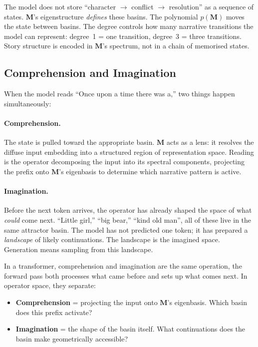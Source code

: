\documentclass[11pt, a4paper]{article}
\newcommand{\M}{\mathbf{M}}
\theoremstyle{plain}
\theoremstyle{definition}
\theoremstyle{remark}
\begin{document}
The model does not store ``character $\to$ conflict $\to$ resolution'' as a sequence of states.
$\M$'s eigenstructure \emph{defines} these basins.
The polynomial $p(\M)$ moves the state between basins.
The degree controls how many narrative transitions the model can represent: degree~1 = one transition, degree~3 = three transitions.
Story structure is encoded in $\M$'s spectrum, not in a chain of memorised states.

\subsection{Comprehension and Imagination}

When the model reads ``Once upon a time there was a,'' two things happen simultaneously:

\paragraph{Comprehension.}
The state is pulled toward the appropriate basin.
$\M$ acts as a lens: it resolves the diffuse input embedding into a structured region of representation space.
Reading is the operator decomposing the input into its spectral components, projecting the prefix onto $\M$'s eigenbasis to determine which narrative pattern is active.

\paragraph{Imagination.}
Before the next token arrives, the operator has already shaped the space of what \emph{could} come next.
``Little girl,'' ``big bear,'' ``kind old man'', all of these live in the same attractor basin.
The model has not predicted one token; it has prepared a \emph{landscape} of likely continuations.
The landscape is the imagined space.
Generation means sampling from this landscape.

In a transformer, comprehension and imagination are the same operation, the forward pass both processes what came before and sets up what comes next.
In operator space, they separate:
\begin{itemize}[nosep]
\item \textbf{Comprehension} = projecting the input onto $\M$'s eigenbasis.
      Which basin does this prefix activate?
\item \textbf{Imagination} = the shape of the basin itself.
      What continuations does the basin make geometrically accessible?
\end{itemize}
\end{document}
